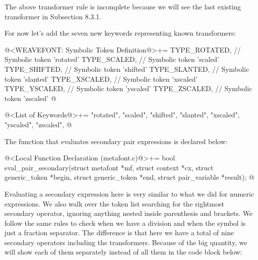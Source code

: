 The above transformer rule is incomplete because we will see the last
existing transformer in Subsection 8.3.1.

For now let's add the seven new keywords representing known
transformers:

\iniciocodigo
@<WEAVEFONT: Symbolic Token Definition@>+=
TYPE_ROTATED,  // Symbolic token 'rotated'
TYPE_SCALED,   // Symbolic token 'scaled'
TYPE_SHIFTED,  // Symbolic token 'shifted'
TYPE_SLANTED,  // Symbolic token 'slanted'
TYPE_XSCALED,  // Symbolic token 'xscaled'
TYPE_YSCALED,  // Symbolic token 'yscaled'
TYPE_ZSCALED,  // Symbolic token 'zscaled'
@
\fimcodigo

\iniciocodigo
@<List of Keywords@>+=
"rotated", "scaled", "shifted", "slanted", "xscaled", "yscaled",
"zscaled",
@
\fimcodigo


The function that evaluates secondary pair expressions is declared
below:

\iniciocodigo
@<Local Function Declaration (metafont.c)@>+=
bool eval_pair_secondary(struct metafont *mf, struct context *cx,
                         struct generic_token *begin,
                         struct generic_token *end,
                         struct pair_variable *result);
@
\fimcodigo

Evaluating a secondary expression here is very similar to what we did
for numeric expressions. We also walk over the token list searching
for the rightmost secondary operator, ignoring anything nested inside
parenthesis and brackets. We follow the same rules to check when we
have a division and when the symbol \monoespaco{/} is just a fraction
separator. The difference is that here we have a total of nine
secondary operators including the transformers. Because of the big
quantity, we will show each of them separately instead of all them in
the code block below:

